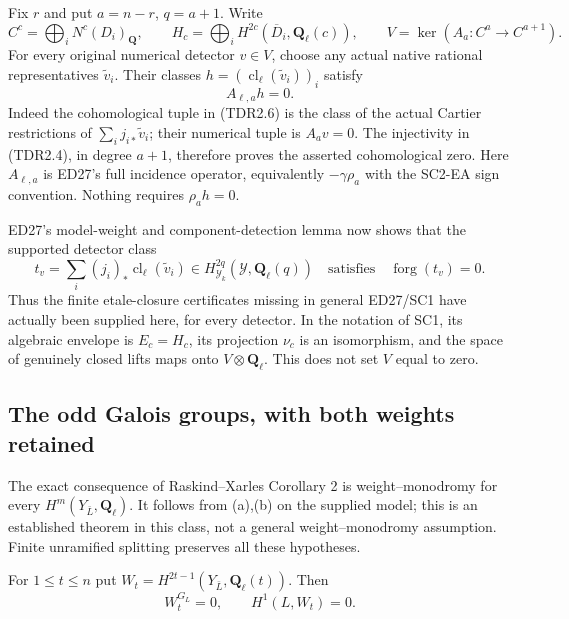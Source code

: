 Fix $r$ and put $a=n-r$, $q=a+1$. Write
\[
 C^c=\bigoplus_iN^c(D_i)_{\mathbf Q},\qquad
 H_c=\bigoplus_iH^{2c}(\overline D_i,\mathbf Q_\ell(c)),
 \qquad V=\ker(A_a:C^a\to C^{a+1}).
 \tag{TDR2.5}
\]
For every original numerical detector $v\in V$, choose any actual
native rational representatives $\widetilde v_i$. Their classes
$h=(\operatorname{cl}_\ell(\widetilde v_i))_i$ satisfy
\[
                    A_{\ell,a}h=0.
 \tag{TDR2.6}
\]
Indeed the cohomological tuple in (TDR2.6) is the class of the actual
Cartier restrictions of $\sum_i j_{i*}\widetilde v_i$; their numerical
tuple is $A_av=0$. The injectivity in (TDR2.4), in degree $a+1$,
therefore proves the asserted cohomological zero. Here $A_{\ell,a}$
is ED27's full incidence operator, equivalently $-\gamma\rho_a$ with
the SC2-EA sign convention. Nothing requires $\rho_a h=0$.

ED27's model-weight and component-detection lemma now shows that the
supported detector class
\[
 t_v=\sum_i(j_i)_*\operatorname{cl}_\ell(\widetilde v_i)
       \in H^{2q}_{\mathcal Y_k}(\mathcal Y,\mathbf Q_\ell(q))
 \quad\text{satisfies}\quad \operatorname{forg}(t_v)=0.
 \tag{TDR2.7}
\]
Thus the finite etale-closure certificates missing in general ED27/SC1
have actually been supplied here, for every detector. In the notation
of SC1, its algebraic envelope is $E_c=H_c$, its projection $\nu_c$
is an isomorphism, and the space of genuinely closed lifts maps onto
$V\otimes\mathbf Q_\ell$. This does not set $V$ equal to zero.

\subsection{The odd Galois groups, with both weights retained}

The exact consequence of Raskind--Xarles Corollary 2 is
weight--monodromy for every $H^m(Y_{\bar L},\mathbf Q_\ell)$.
It follows from (a),(b) on the supplied model; this is an established
theorem in this class, not a general weight--monodromy assumption.
Finite unramified splitting preserves all these hypotheses.

\begin{lemma}
\label{sc2td:odd}
For $1\leq t\leq n$ put
$W_t=H^{2t-1}(Y_{\bar L},\mathbf Q_\ell(t))$. Then
\[
                         W_t^{G_L}=0,
 \qquad                  H^1(L,W_t)=0.
 \tag{TDR2.8}
\]
\end{lemma}

